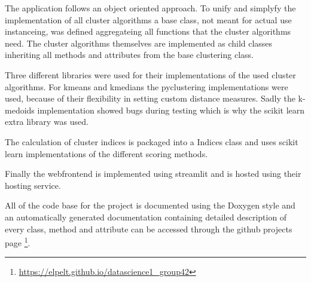 The application follows an object oriented approach. To unify and simplyfy the implementation of all cluster algorithms a base class, not meant for actual use instanceing, was defined aggregateing all functions that the cluster algorithms need.
The cluster algorithms themselves are implemented as child classes inheriting all methods and attributes from the base clustering class.

Three different libraries were used for their implementations of the used cluster algorithms. 
For kmeans and kmedians the pyclustering \cite{Novikov2019} implementations were used, because of their flexibility in setting custom distance measures. 
Sadly the k-medoids implementation showed bugs during testing which is why the scikit learn extra library was used.

The calculation of cluster indices is packaged into a Indices class and uses scikit learn implementations of the different scoring methods.

Finally the webfrontend is implemented using streamlit and is hosted using their hosting service.

All of the code base for the project is documented using the Doxygen style and an automatically generated documentation containing detailed description of every class, method and attribute can be accessed through the github projects page \footnote{\url{https://elpelt.github.io/datascience1_group42}}.